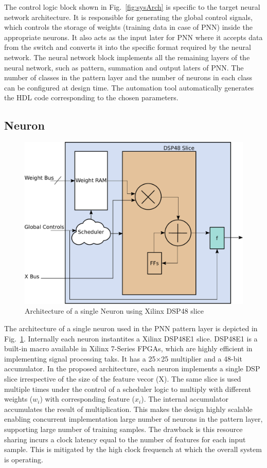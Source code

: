 The control logic block shown in Fig.~\ref{fig:sysArch} is specific to the target neural network architecture.
It is responsible for generating the global control signals, which controls the storage of weights (training data in case of PNN) inside the appropriate neurons.
It also acts as the input later for PNN where it accepts data from the switch and converts it into the specific format required by the neural network.
The neural network block implements all the remaining layers of the neural network, such as pattern, summation and output laters of PNN.
The number of classes in the pattern layer and the number of neurons in each class can be configured at design time.
The automation tool automatically generates the HDL code corresponding to the chosen parameters.

\subsection{Neuron}
\begin{figure}[t]
\centering
   \includegraphics[height=0.6\columnwidth]{Figures/neuron.pdf}
   \caption{Architecture of a single Neuron using Xilinx DSP48 slice}
   \label{fig:neuron}
\end{figure}
The architecture of a single neuron used in the PNN pattern layer is depicted in Fig.~\ref{fig:neuron}.
Internally each neuron instantites a Xilinx DSP48E1 slice.
DSP48E1 is a built-in macro available in Xilinx 7-Series FPGAs, which are highly efficient in implementing signal processing taks.
It has a 25$\times$25 multiplier and a 48-bit accumulator.
In the proposed architecture, each neuron implements a single DSP slice irrespective of the size of the feature vecor (X).
The same slice is used multiple times under the control of a scheduler logic to multiply with different weights ($w_{i}$) with corresponding feature ($x_{i}$).
The internal accumulator accumulates the result of multiplication.
This makes the design highly scalable enabling concurrent implementation large number of neurons in the pattern layer, supporting large number of training samples.
The drawback is this resource sharing incurs a clock latency equal to the number of features for each input sample.
This is mitigated by the high clock frequench at which the overall system is operating.

